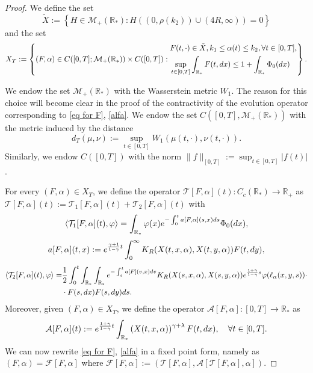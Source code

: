 \documentclass[11pt]{article}
\numberwithin{equation}{section}
\theoremstyle{plain}
\newcommand{\der}{\textup{d}}
\begin{document}
\begin{proof}
We define the set 
\[ 
\tilde{X}:= \left\{ H \in \mathcal M_{+}(\mathbb R_*) : H((0,\rho(k_2)) \cup (4R, \infty))=0\right\}
\]
and the set 
\[
X_T:=\left\{ (F,\alpha) \in C([0,T]; \mathcal M_{+}(\mathbb R_*)) \times C([0,T]) :
\begin{aligned}\textup{ } & F(t,\cdot) \in \tilde{X},  k_1 \leq  \alpha(t) \leq k_2,  \forall t \in [0, T],\\
&\sup_{t\in[0,T]}\int_{\mathbb{R}_{\ast}}F(t,\der x)\leq 1+\int_{\mathbb{R}_{\ast}}\Phi_{0}(\der x)
\end{aligned} 
\right\}.
\] 


We endow the set $\mathcal M_{+}(\mathbb R_*) $ with the Wasserstein metric $W_{1}$. 
The reason for this choice will become clear in the proof of the contractivity of the evolution operator corresponding to \eqref{eq for F}, \eqref{alfa}. 
We endow the set $C([0,T], \mathcal M_+(\mathbb R_*))$ with the metric induced by the distance 
\[
d_T(\mu, \nu):=\sup_{t \in [0,T] } W_1(\mu(t, \cdot) , \nu(t, \cdot)).
\] 
Similarly, we endow $C([0,T])$ with the norm $\| f \|_{[0,T]}:= \sup_{ t \in [0, T]} | f(t) |$. 

For every $(F, \alpha) \in X_T$, we define the operator $\mathcal T[F,\alpha](t): C_c(\mathbb R_*) \rightarrow \mathbb R_{+}$ as $\mathcal T [F,\alpha](t):= \mathcal T_1[F,\alpha](t)+\mathcal T_2[F,\alpha](t)$  with 
\[
\langle \mathcal T_1[F,\alpha](t), \varphi \rangle=  \int_{\mathbb R_*}
\varphi (x) e^{-\int_{0}^{t}a[F,\alpha](s,x)\der s} \Phi_0( \der x),
\] 
\[
a[F,\alpha](t,x):=e^{\frac{\gamma +1 }{1-\gamma }t} \int_0^\infty K_R(X(t,x,\alpha), X(t,y,\alpha)) F(t, \der y),
\]
\begin{align*}
 \langle \mathcal  T_2[F,\alpha](t), \varphi \rangle=&\frac{1}{2}  \int_0^t \int_{\mathbb R_*} \int_{\mathbb R_*} e^{- \int_s^t a[F](v,x) dv}  K_R(X(s,x,\alpha),X(s,y, \alpha ))e^{\frac{1+\gamma}{1-\gamma}s}\varphi(\ell_\alpha(x,y,s)) \cdot \\
 & \cdot F(s, \der x) F(s, \der y)\der s. 
\end{align*}
Moreover, given $(F, \alpha) \in X_T $, we define the operator $\mathcal A[F,\alpha]: [0, T] \rightarrow \mathbb R_*$ as 
\[
\mathcal A[F,\alpha](t) := e^{\frac{1+\gamma}{1-\gamma} t}\int_{\mathbb R_*} \left(X(t,x, \alpha)\right)^{\gamma+\lambda} F(t, \der x ), \quad \forall t \in [0,T].
\] 
We can now rewrite \eqref{eq for F}, \eqref{alfa} in a fixed point form, namely as $(F,\alpha)=\mathcal F[F, \alpha]$ where
$\mathcal F[F,\alpha]:= (\mathcal T[F,\alpha], \mathcal A[\mathcal T[F,\alpha] , \alpha ])$.


\end{proof}
\end{document}
